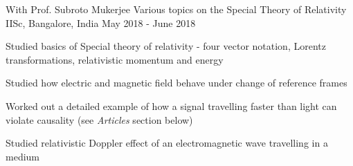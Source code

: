 \begin{cventries}
   \cventry
  {With Prof. Subroto Mukerjee} %
  {Various topics on the Special Theory of Relativity} %
  {IISc, Bangalore, India} %
  {May 2018 - June 2018} %
  {
  	\begin{cvitems} %
  		\item {Studied basics of Special theory of relativity - four vector notation, Lorentz transformations, relativistic momentum and energy}
  		\item {Studied how electric and magnetic field behave under change of reference frames}
  		\item {Worked out a detailed example of how a signal travelling faster than light can violate causality (see \textit{Articles} section below)}
  		\item {Studied relativistic Doppler effect of an electromagnetic wave travelling in a medium}
  	\end{cvitems}
  }

\end{cventries}
